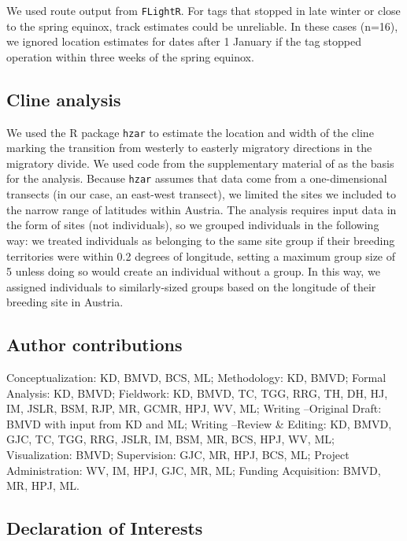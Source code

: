 \documentclass[a4paper, twoside]{templates/ociamthesis}
\begin{document}
We used route output from \texttt{FLightR}. For tags that stopped in late winter or close to the spring equinox, track estimates could be unreliable. In these cases (n=16), we ignored location estimates for dates after 1 January if the tag stopped operation within three weeks of the spring equinox.

\hypertarget{cline-analysis}{%
\subsection{Cline analysis}\label{cline-analysis}}

We used the R package \texttt{hzar} \autocite{derryberryHzarHybridZone2014} to estimate the location and width of the cline marking the transition from westerly to easterly migratory directions in the migratory divide. We used code from the supplementary material of \autocite{derryberryHzarHybridZone2014} as the basis for the analysis. Because \texttt{hzar} assumes that data come from a one-dimensional transects (in our case, an east-west transect), we limited the sites we included to the narrow range of latitudes within Austria. The analysis requires input data in the form of sites (not individuals), so we grouped individuals in the following way: we treated individuals as belonging to the same site group if their breeding territories were within 0.2 degrees of longitude, setting a maximum group size of 5 unless doing so would create an individual without a group. In this way, we assigned individuals to similarly-sized groups based on the longitude of their breeding site in Austria.

\hypertarget{author-contributions}{%
\subsection{Author contributions}\label{author-contributions}}

Conceptualization: KD, BMVD, BCS, ML; Methodology: KD, BMVD; Formal Analysis: KD, BMVD; Fieldwork: KD, BMVD, TC, TGG, RRG, TH, DH, HJ, IM, JSLR, BSM, RJP, MR, GCMR, HPJ, WV, ML; Writing --Original Draft: BMVD with input from KD and ML; Writing --Review \& Editing: KD, BMVD, GJC, TC, TGG, RRG, JSLR, IM, BSM, MR, BCS, HPJ, WV, ML; Visualization: BMVD; Supervision: GJC, MR, HPJ, BCS, ML; Project Administration: WV, IM, HPJ, GJC, MR, ML; Funding Acquisition: BMVD, MR, HPJ, ML.

\hypertarget{declaration-of-interests}{%
\subsection{Declaration of Interests}\label{declaration-of-interests}}
\end{document}

